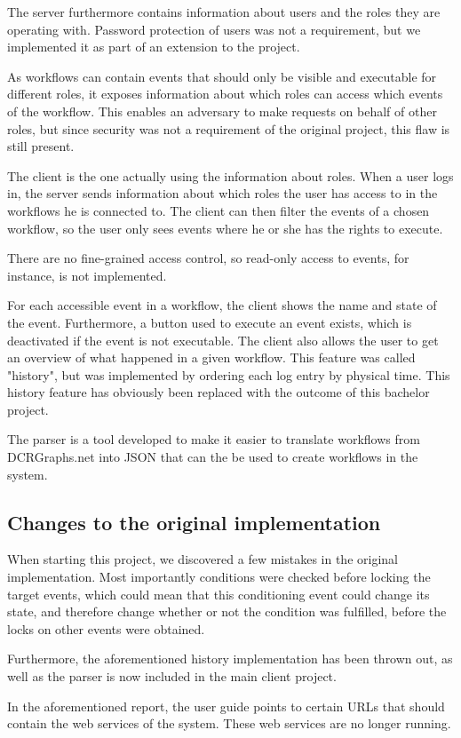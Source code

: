 		\newpar The server furthermore contains information about users and the roles they are operating with. Password protection of users was not a requirement, but we implemented it as part of an extension to the project.
		
		\newpar As workflows can contain events that should only be visible and executable for different roles, it exposes information about which roles can access which events of the workflow. This enables an adversary to make requests on behalf of other roles, but since security was not a requirement of the original project, this flaw is still present.
		
		\newpar The client is the one actually using the information about roles. When a user logs in, the server sends information about which roles the user has access to in the workflows he is connected to. The client can then filter the events of a chosen workflow, so the user only sees events where he or she has the rights to execute.
		
		There are no fine-grained access control, so read-only access to events, for instance, is not implemented.
		
		\newpar For each accessible event in a workflow, the client shows the name and state of the event. Furthermore, a button used to execute an event exists, which is deactivated if the event is not executable. The client also allows the user to get an overview of what happened in a given workflow. This feature was called "history", but was implemented by ordering each log entry by physical time. This history feature has obviously been replaced with the outcome of this bachelor project.
		
		\newpar The parser is a tool developed to make it easier to translate workflows from DCRGraphs.net into JSON that can the be used to create workflows in the system.
		
		\subsection{Changes to the original implementation}
			When starting this project, we discovered a few mistakes in the original implementation. Most importantly conditions were checked before locking the target events, which could mean that this conditioning event could change its state, and therefore change whether or not the condition was fulfilled, before the locks on other events were obtained. 
            
            Furthermore, the aforementioned history implementation has been thrown out, as well as the parser is now included in the main client project.

			\newpar In the aforementioned report, the user guide points to certain URLs that should contain the web services of the system. These web services are no longer running.